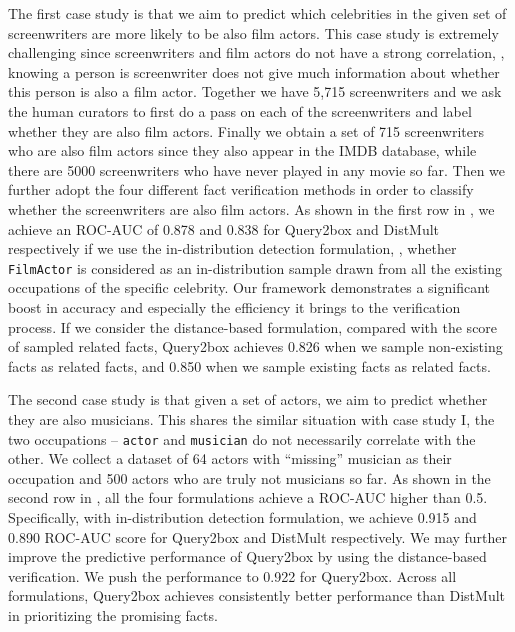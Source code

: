 The first case study is that we aim to predict which celebrities in the given set of screenwriters are more likely to be also film actors. This case study is extremely challenging since screenwriters and film actors do not have a strong correlation, \ie, knowing a person is screenwriter does not give much information about whether this person is also a film actor. Together we have 5,715 screenwriters and we ask the human curators to first do a pass on each of the screenwriters and label whether they are also film actors. Finally we obtain a set of 715 screenwriters who are also film actors since they also appear in the IMDB database, while there are 5000 screenwriters who have never played in any movie so far. 
Then we further adopt the four different fact verification methods in order to classify whether the screenwriters are also film actors.
As shown in the first row in , we achieve an ROC-AUC of 0.878 and 0.838 for Query2box and DistMult respectively if we use the in-distribution detection formulation, \ie, whether \texttt{FilmActor} is considered as an in-distribution sample drawn from all the existing occupations of the specific celebrity. 
Our framework demonstrates a significant boost in accuracy and especially the efficiency it brings to the verification process. If we consider the distance-based formulation, compared with the score of sampled related facts, Query2box achieves 0.826 when we sample non-existing facts as related facts, and 0.850 when we sample existing facts as related facts. 

The second case study is that given a set of actors, we aim to predict whether they are also musicians. This shares the similar situation with case study I, the two occupations -- \texttt{actor} and \texttt{musician} do not necessarily correlate with the other.
We collect a dataset of 64 actors with ``missing'' musician as their occupation and 500 actors who are truly not musicians so far. 
As shown in the second row in , all the four formulations achieve a ROC-AUC higher than 0.5. Specifically, with in-distribution detection formulation, we achieve 0.915 and 0.890 ROC-AUC score for Query2box and DistMult respectively. We may further improve the predictive performance of Query2box by using the distance-based verification. We push the performance to 0.922 for Query2box. Across all formulations, Query2box achieves consistently better performance than DistMult in prioritizing the promising facts. 

